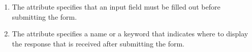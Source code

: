 \documentclass[11pt,a4paper]{article}
\begin{document}
\begin{enumerate}
\item The \underline{\hspace{2cm}} attribute specifies that an input field must be filled out before submitting the form.
\item The \underline{\hspace{2cm}} attribute specifies a name or a keyword that indicates where to display the response that is received after submitting the form.
\end{enumerate}
\end{document}
